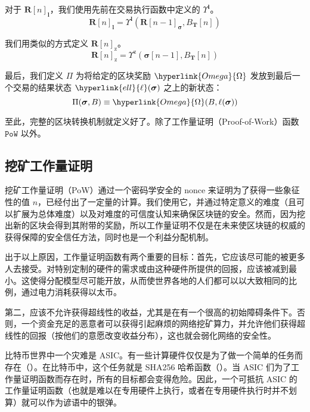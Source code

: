 \documentclass[9pt,oneside]{amsart}
\begin{document}
\begin{multicols}{2}
对于 $\mathbf{R}[n]_{\mathbf{l}}$，我们使用先前在交易执行函数中定义的 \hyperlink{Upsilon_pow_l}{$\Upsilon^\mathbf{l}$}。
\begin{equation}
\mathbf{R}[n]_\mathbf{l} =
\Upsilon^\mathbf{l}(\mathbf{R}[n - 1]_{\boldsymbol{\sigma}}, B_\mathbf{T}[n])
\end{equation}

我们用类似的方式定义 \hyperlink{Upsilon_pow_z}{$\mathbf{R}[n]_{\mathrm{z}}$}。
\begin{equation}
\mathbf{R}[n]_{\mathrm{z}} =
\Upsilon^{\mathrm{z}}(\boldsymbol{\sigma}[n - 1], B_{\mathbf{T}}[n])
\end{equation}

\hypertarget{Pi}{}最后，我们定义 $\Pi$ 为将给定的区块奖励 $\hyperlink{Omega}{\Omega}$ 发放到最后一个交易的结果状态 $\hyperlink{ell}{\ell}(\boldsymbol{\sigma})$ 之上的新状态：
\begin{equation}
\Pi(\boldsymbol{\sigma}, B) \equiv \hyperlink{Omega}{\Omega}(B, \ell(\boldsymbol{\sigma}))
\end{equation}

至此，完整的区块转换机制就定义好了。除了工作量证明（Proof-of-Work）函数 $\mathtt{PoW}$ 以外。

\subsection{挖矿工作量证明} \label{ch:pow}

挖矿工作量证明（PoW）通过一个密码学安全的 nonce 来证明为了获得一些象征性的值 $n$，已经付出了一定量的计算。我们使用它，并通过特定意义的难度（且可以扩展为总体难度）以及对难度的可信度认知来确保区块链的安全。然而，因为挖出新的区块会得到其附带的奖励，所以工作量证明不仅是在未来使区块链的权威的获得保障的安全信任方法，同时也是一个利益分配机制。

出于以上原因，工作量证明函数有两个重要的目标：首先，它应该尽可能的被更多人去接受。对特别定制的硬件的需求或由这种硬件所提供的回报，应该被减到最小。这使得分配模型尽可能开放，从而使世界各地的人们都可以以大致相同的比例，通过电力消耗获得以太币。

第二，应该不允许获得超线性的收益，尤其是在有一个很高的初始障碍条件下。否则，一个资金充足的恶意者可以获得引起麻烦的网络挖矿算力，并允许他们获得超线性的回报（按他们的意愿改变收益分布），这也就会弱化网络的安全性。

比特币世界中一个灾难是 ASIC。有一些计算硬件仅仅是为了做一个简单的任务而存在（\cite{ASICSmithMJS}）。在比特币中，这个任务就是 SHA256 哈希函数（\cite{Courtois2014}）。当 ASIC 们为了工作量证明函数而存在时，所有的目标都会变得危险。因此，一个可抵抗 ASIC 的工作量证明函数（也就是难以在专用硬件上执行，或者在专用硬件执行时并不划算）就可以作为谚语中的银弹。


\end{multicols}
\end{document}
